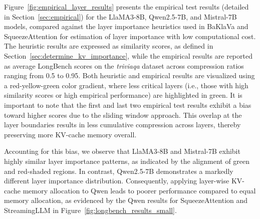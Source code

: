Figure~\ref{fig:empirical_layer_results} presents the empirical test results (detailed in Section~\ref{sec:empirical}) for the LlaMA3-8B, Qwen2.5-7B, and Mistral-7B models, compared against the layer importance heuristics used in BaKlaVa and SqueezeAttention for estimation of layer importance with low computational cost. The heuristic results are expressed as similarity scores, as defined in Section~\ref{sec:determine_kv_importance}, while the empirical results are reported as average LongBench scores on the \textit{triviaqa} dataset across compression ratios ranging from 0.5 to 0.95. Both heuristic and empirical results are visualized using a red-yellow-green color gradient, where less critical layers (i.e., those with high similarity scores or high empirical performance) are highlighted in green. It is important to note that the first and last two empirical test results exhibit a bias toward higher scores due to the sliding window approach. This overlap at the layer boundaries results in less cumulative compression across layers, thereby preserving more KV-cache memory overall.


Accounting for this bias, we observe that LlaMA3-8B and Mistral-7B exhibit highly similar layer importance patterns, as indicated by the alignment of green and red-shaded regions. In contrast, Qwen2.5-7B demonstrates a markedly different layer importance distribution. Consequently, applying layer-wise KV-cache memory allocation to Qwen leads to poorer performance compared to equal memory allocation, as evidenced by the Qwen results for SqueezeAttention and StreamingLLM in Figure~\ref{fig:longbench_results_small}.

